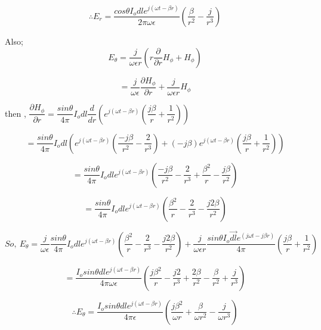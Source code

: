 	\begin{equation}
	\therefore E_r = \dfrac{cos \theta I_o dl e^{j(\omega t-\beta r)} }{2\pi \omega \epsilon} \left(\dfrac{\beta}{r^2} - \dfrac{j}{r^3}\right)
	\end{equation}
	 
	Also; 
	$$ E_{\theta} = \dfrac{j}{\omega\epsilon r}\left(r\dfrac{\partial}{\partial r}H_{\phi} + H_{\phi}\right)$$ 
	
	$$ =  \dfrac{j}{\omega \epsilon}\dfrac{\partial H_{\phi}}{\partial r} + \dfrac{j }{\omega \epsilon r}H_{\phi}$$
	
	then , $\dfrac{\partial H_{\phi}}{\partial r} = \dfrac{sin \theta}{4 \pi} I_o dl \dfrac{d}{dr}\left(e^{j(\omega t - \beta r)}\left(\dfrac{j \beta}{r} + \dfrac{1}{r^2}\right)\right)$ 
	
	\begin{dmath*}
		 = \dfrac{sin \theta}{4 \pi} I_o dl \left(e^{j(\omega t - \beta r)}\left(\dfrac{-j\beta}{r^2} - \dfrac{2}{r^3}\right) + (-j\beta)e^{j(\omega t - \beta r)}\left(\dfrac{j \beta}{r} + \dfrac{1}{r^2}\right)\right)
	\end{dmath*}
	
	$$ = \dfrac{sin \theta}{4 \pi} I_o dle^{j(\omega t - \beta r)} \left(\dfrac{-j\beta}{r^2} - \dfrac{2}{r^3} + \dfrac{\beta^2}{r} - \dfrac{j\beta}{r^2}\right)$$
	
	$$ = \dfrac{sin \theta}{4 \pi} I_o dle^{j(\omega t - \beta r)} \left( \dfrac{\beta^2}{r} - \dfrac{2}{r^3}  - \dfrac{j2\beta}{r^2}\right)$$
	
	\begin{dmath*}
		So,\ E_{\theta} =  \dfrac{j}{\omega\epsilon}\dfrac{sin \theta}{4 \pi} I_o dle^{j(\omega t - \beta r)}\left( \dfrac{\beta^2}{r} - \dfrac{2}{r^3}  - \dfrac{j2\beta}{r^2}\right) + \dfrac{j}{\omega \epsilon r}\dfrac{sin\theta I_o\vec{dl} e^{(j\omega t-j\beta r)} }{4\pi} \left(\dfrac{j\beta}{r} + \dfrac{1}{r^2}\right)
	\end{dmath*}
	
	$$ = \dfrac{I_osin \theta dl e^{j(\omega t - \beta r)}}{4\pi \omega\epsilon}\left(\dfrac{j\beta^2}{r} - \dfrac{j2}{r^3} + \dfrac{2\beta}{r^2} - \dfrac{\beta}{r^2} + \dfrac{j}{r^3}\right)$$
	
	\begin{equation}
	\therefore E_{\theta} = \dfrac{I_osin \theta dl e^{j(\omega t - \beta r)}}{4\pi \epsilon}\left(\dfrac{j\beta^2}{\omega r} + \dfrac{\beta}{\omega r^2} - \dfrac{j}{\omega r^3}\right)
	\end{equation}
	
